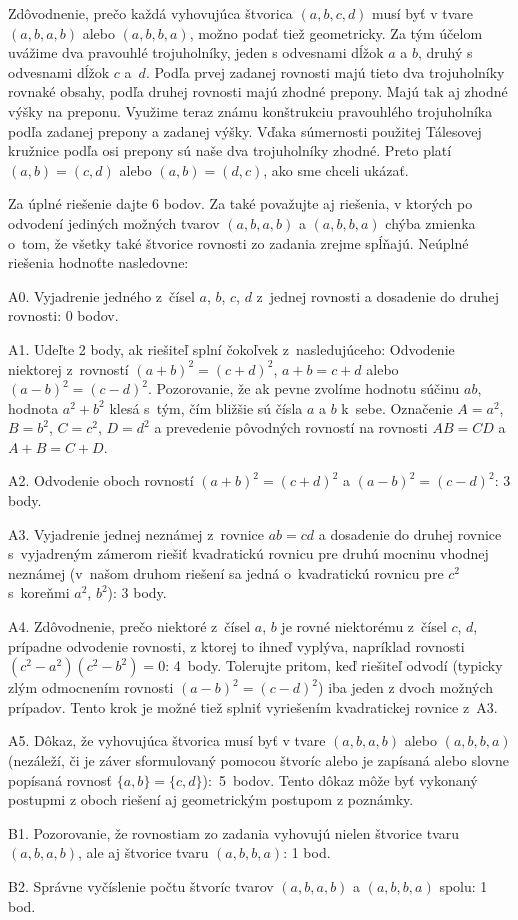 {\poznamka
Zdôvodnenie, prečo každá vyhovujúca štvorica $(a,b,c,d)$ musí
byť v tvare $(a,b,a,b)$ alebo $(a,b,b,a)$, možno podať
tiež geometricky. Za tým účelom uvážime dva pravouhlé trojuholníky,
jeden s odvesnami dĺžok
$a$ a $b$, druhý s odvesnami dĺžok $c$ a~$d$. Podľa prvej zadanej
rovnosti majú tieto dva trojuholníky rovnaké obsahy, podľa druhej rovnosti
majú zhodné prepony. Majú tak aj zhodné výšky na preponu.
Využime teraz známu konštrukciu pravouhlého trojuholníka
podľa zadanej prepony a zadanej výšky. Vďaka súmernosti použitej
Tálesovej kružnice podľa osi prepony sú naše dva trojuholníky zhodné.
Preto platí $(a,b)=(c,d)$ alebo $(a,b)=(d,c)$, ako sme chceli
ukázať.
%

\schemaABC
Za úplné riešenie dajte 6 bodov. Za také považujte aj riešenia,
v ktorých po odvodení jediných možných tvarov $(a,b,a,b)$
a $(a,b,b,a)$ chýba zmienka o~tom, že všetky také štvorice
rovnosti zo zadania
zrejme spĺňajú. Neúplné riešenia hodnoťte nasledovne:

\smallskip
\item{A0.} Vyjadrenie jedného z~čísel $a$, $b$, $c$, $d$ z~jednej rovnosti a dosadenie do druhej rovnosti: 0 bodov.
\item{A1.} Udeľte 2 body, ak riešiteľ splní čokoľvek z~nasledujúceho:
\itemitem{$\triangleright$} Odvodenie niektorej z~rovností $(a+b)^2=(c+d)^2$, $a+b=c+d$ alebo $(a-b)^2=(c-d )^2$.
\itemitem{$\triangleright$} Pozorovanie, že ak pevne zvolíme hodnotu súčinu $ab$, hodnota $a^2+b^2$ klesá s~tým, čím bližšie sú čísla $a$ a $b$ k~sebe.
\itemitem{$\triangleright$} Označenie $A=a^2$, $B=b^2$, $C=c^2$, $D=d^2$ a prevedenie pôvodných rovností na rovnosti $AB=CD$ a $A+B=C+D$.
\item{A2.} Odvodenie oboch rovností $(a+b)^2=(c+d)^2$ a $(a-b)^2=(c-d)^2$: 3 body.
\item{A3.} Vyjadrenie jednej neznámej z~rovnice $ab=cd$ a dosadenie do druhej rovnice s~vyjadreným zámerom riešiť kvadratickú rovnicu pre druhú mocninu vhodnej neznámej (v~našom druhom riešení sa jedná o~kvadratickú rovnicu pre $c^2$ s~koreňmi $a^2$, $b^2$): 3 body.
\item{A4.} Zdôvodnenie, prečo niektoré z~čísel $a$, $b$ je rovné niektorému z~čísel $c$, $d$, prípadne odvodenie rovnosti, z ktorej to ihneď vyplýva, napríklad rovnosti $(c^2-a^2)(c^2-b^2)=0$: 4~body.\hfil\break
Tolerujte pritom, keď riešiteľ odvodí (typicky zlým odmocnením rovnosti $(a-b)^2=(c-d)^2$) iba jeden z dvoch možných prípadov. Tento krok je možné tiež splniť vyriešením kvadratickej rovnice z~A3.
\item{A5.} Dôkaz, že vyhovujúca štvorica musí byť v tvare $(a,b,a,b)$ alebo $(a,b,b,a)$ (nezáleží, či je záver sformulovaný pomocou štvoríc alebo je zapísaná alebo slovne popísaná rovnosť $\{a,b\}=\{c,d\}$):~5~bodov.\hfil\break
Tento dôkaz môže byť vykonaný postupmi z oboch riešení aj geometrickým postupom z poznámky.
\item{B1.} Pozorovanie, že rovnostiam zo zadania vyhovujú nielen štvorice tvaru $(a,b,a,b)$, ale aj štvorice tvaru $(a,b,b,a)$: 1 bod.
\item{B2.} Správne vyčíslenie počtu štvoríc tvarov $(a,b,a,b)$ a $(a,b,b,a)$ spolu: 1 bod.

}
